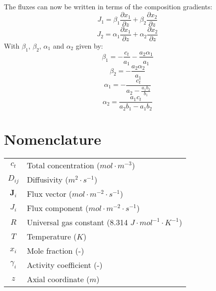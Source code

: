 \documentclass[twocolumn]{article}
\begin{document}
The fluxes can now be written in terms of the composition gradients:
\begin{equation}
\label{eqn:eqn_16}
J_1 = \beta_1 \frac{\partial x_1}{\partial z} + \beta_2 \frac{\partial x_2}{\partial z}
\end{equation}
\begin{equation}
\label{eqn:eqn_17}
J_2 = \alpha_1 \frac{\partial x_1}{\partial z} + \alpha_2 \frac{\partial x_2}{\partial z}
\end{equation}
With $\beta_1$, $\beta_2$, $\alpha_1$ and $\alpha_2$ given by:
\begin{equation}
\label{eqn:eqn_18}
\beta_1 = -\frac{c_t}{a_1} - \frac{a_2 \alpha_1}{a_1}
\end{equation}
\begin{equation}
\label{eqn:eqn_19}
\beta_2 = - \frac{a_2 \alpha_2}{a_1}
\end{equation}
\begin{equation}
\label{eqn:eqn_20}
\alpha_1 = - \frac{c_t}{a_2 - \frac{a_1 b_2}{b_1}}
\end{equation}
\begin{equation}
\label{eqn:eqn_21}
\alpha_2 = \frac{a_1 c_t}{a_2 b_1 - a_1 b_2}
\end{equation}

\section*{Nomenclature}
\begin{table}[H]
    \begin{tabular}{c l}       
      $c_t$ & Total concentration ($mol \cdot m^{-3}$) \\
      $D_{ij}$ & Diffusivity ($m^2 \cdot s^{-1}$) \\
      $\textbf{J}_i$ & Flux vector ($mol \cdot m^{-2} \cdot s^{-1}$) \\
      $J_i$ & Flux component ($mol \cdot m^{-2} \cdot s^{-1}$) \\   
      $R$ & Universal gas constant (8.314 $J \cdot mol^{-1} \cdot K^{-1}$) \\  
      $T$ & Temperature ($K$) \\       
      $x_i$ & Mole fraction (-)\\
      $\gamma_i$ & Activity coefficient (-) \\
      $z$ & Axial coordinate ($m$) \\
    \end{tabular}
\end{table}
\end{document}
